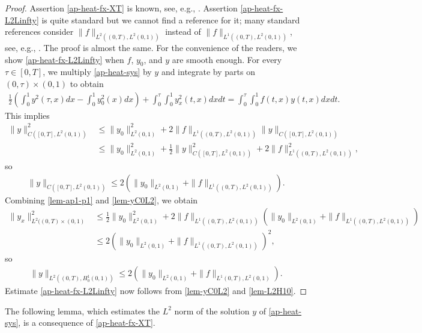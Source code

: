 \documentclass[11pt, reqno]{amsart}
\theoremstyle{plain}
\numberwithin{equation}{section}
\begin{document}
\begin{proof} Assertion \eqref{ap-heat-fx-XT} is known, see, e.g., \cite[Section 7.1]{Evans}.  Assertion \eqref{ap-heat-fx-L2Linfty} is quite standard but we cannot find a reference for it;  many standard references consider $\|f\|_{L^2((0, T), L^2(0, 1))}$ instead of  $\|f\|_{L^1((0, T), L^2(0, 1))}$, see, e.g., \cite[Section 7.1]{Evans}.  The proof is almost the same. For the convenience of the readers, we show \eqref{ap-heat-fx-L2Linfty} when $f$, $y_0$, and $y$ are smooth enough. For every $\tau \in [0, T]$, we multiply \eqref{ap-heat-sys} by $y$ and integrate by parts on $(0, \tau) \times (0, 1)$ to obtain 
\begin{align} \label{lem-ap1-p1}
\frac{1}{2} \left(\int_0^1 y^2(\tau, x) dx - \int_0^1 y_0^2(x) dx \right) + \int_0^{\tau} \int_0^1 y^2_x(t, x) dx dt = \int_0^{\tau} \int_0^1 f(t, x) y(t, x) dx dt.
\end{align}
This implies 
	\begin{align*}
		\|y\|_{C([0, T], L^2(0, 1))}^2 &\leq \|y_0\|^2_{L^2(0, 1)} + 2 \|f\|_{L^1((0, T), L^2(0, 1))}  \|y\|_{C([0, T], L^2(0, 1))} \\
		&\leq \|y_0\|_{L^2(0, 1)}^2 + \frac{1}{2} \|y\|^2_{C([0, T], L^2(0, 1))} + 2 \|f\|_{L^1((0, T), L^2(0, 1))}^2 , 
	\end{align*}
	so
	\begin{align}	\label{lem-yC0L2}
		\|y\|_{C([0, T], L^2(0, 1))} \leq 2 \left(\|y_0\|_{L^2(0, 1)} + \|f\|_{L^1((0, T), L^2(0, 1))}  \right).
	\end{align}
Combining \eqref{lem-ap1-p1} and \eqref{lem-yC0L2}, we obtain 
\begin{align*}
\| y_x \|_{L^2((0, T) \times (0, 1)}^2 &\leq  \frac{1}{2} \|y_0\|^2_{L^2(0, 1)} + 2\|f\|_{L^1((0, T), L^2(0, 1))}   \left(\|y_0\|_{L^2(0, 1)} +\|f\|_{L^1((0, T), L^2(0, 1))}  \right)  \\
		&\leq 2 \left(\|y_0\|_{L^2(0, 1)} + \|f\|_{L^1((0, T), L^2(0, 1))}  \right)^2, 
\end{align*}
so
\begin{align}
	\|y\|_{L^2((0, T), H^1_0(0, 1))} \leq  2 \left(\|y_0\|_{L^2(0, 1)} + \|f\|_{L^1(0, T), L^2(0, 1)} \right).  \label{lem-L2H10} 
\end{align}
Estimate \eqref{ap-heat-fx-L2Linfty} now follows from \eqref{lem-yC0L2} and \eqref{lem-L2H10}.  
\end{proof}

The following lemma, which estimates the $L^2$ norm of the solution $y$ of \eqref{ap-heat-sys}, is a consequence of \eqref{ap-heat-fx-XT}. 
\end{document}
